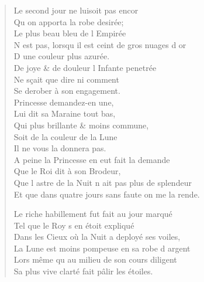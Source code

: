 \documentclass[14pt,a4paper]{memoir}
\begin{document}
{{\begin{otherlanguage}{french}
\begin{verse}
\vin Le second jour ne luisoit pas encor \\
\vin Qu\textquotesingle{} on apporta la robe desirée; \\
\vin Le plus beau bleu de l\textquotesingle{} Empirée \\
N\textquotesingle{} est pas, lorsqu\textquotesingle{} il est ceint de gros nuages d\textquotesingle{} or \\
\vin D\textquotesingle{} une couleur plus azurée. \\
De joye \& de douleur l\textquotesingle{} Infante penetrée \\
\vin Ne sçait que dire ni comment \\
\vin Se derober à son engagement. \\
\vin Princesse demandez-en une, \\
\vin Lui dit sa Maraine tout bas, \\
\vin Qui plus brillante \& moins commune, \\
\vin Soit de la couleur de la Lune \\
\vin Il ne vous la donnera pas. \\
A peine la Princesse en eut fait la demande \\
\vin Que le Roi dit à son Brodeur, \\
Que l\textquotesingle{} astre de la Nuit n\textquotesingle{} ait pas plus de splendeur \\
Et que dans quatre jours sans faute on me la rende.

Le riche habillement fut fait au jour marqué \\
\vin Tel que le Roy s\textquotesingle{} en étoit expliqué \\
Dans les Cieux où la Nuit a deployé ses voiles, \\
La Lune est moins pompeuse en sa robe d\textquotesingle{} argent \\
Lors même qu\textquotesingle{} au milieu de son cours diligent \\
Sa plus vive clarté fait pâlir les étoiles.


\end{verse}
\end{otherlanguage}}}
\end{document}
